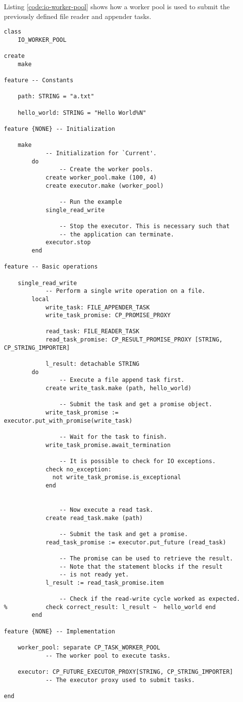 Listing \ref{code:io-worker-pool} shows how a worker pool is used to submit the previously defined file reader and appender tasks.

\begin{lstlisting}[language=OOSC2Eiffel, label={code:io-worker-pool}, captionpos=b, caption={Using a worker pool for futures and asynchronous tasks.}]
class
	IO_WORKER_POOL

create
	make

feature -- Constants

	path: STRING = "a.txt"
	
	hello_world: STRING = "Hello World%N"

feature {NONE} -- Initialization

	make
			-- Initialization for `Current'.
		do
				-- Create the worker pools.
			create worker_pool.make (100, 4)
			create executor.make (worker_pool)

				-- Run the example
			single_read_write

				-- Stop the executor. This is necessary such that 
				-- the application can terminate.
			executor.stop
		end

feature -- Basic operations

	single_read_write
			-- Perform a single write operation on a file.
		local
			write_task: FILE_APPENDER_TASK
			write_task_promise: CP_PROMISE_PROXY

			read_task: FILE_READER_TASK
			read_task_promise: CP_RESULT_PROMISE_PROXY [STRING, CP_STRING_IMPORTER]

			l_result: detachable STRING
		do
				-- Execute a file append task first.
			create write_task.make (path, hello_world)

				-- Submit the task and get a promise object.
			write_task_promise := executor.put_with_promise(write_task)

				-- Wait for the task to finish.
			write_task_promise.await_termination

				-- It is possible to check for IO exceptions.
			check no_exception: 
			  not write_task_promise.is_exceptional 
			end


				-- Now execute a read task.
			create read_task.make (path)

				-- Submit the task and get a promise.
			read_task_promise := executor.put_future (read_task)

				-- The promise can be used to retrieve the result.
				-- Note that the statement blocks if the result
				-- is not ready yet.
			l_result := read_task_promise.item

				-- Check if the read-write cycle worked as expected.
% 			check correct_result: l_result ~  hello_world end
		end

feature {NONE} -- Implementation

	worker_pool: separate CP_TASK_WORKER_POOL
			-- The worker pool to execute tasks.

	executor: CP_FUTURE_EXECUTOR_PROXY[STRING, CP_STRING_IMPORTER]
			-- The executor proxy used to submit tasks.

end
\end{lstlisting}

